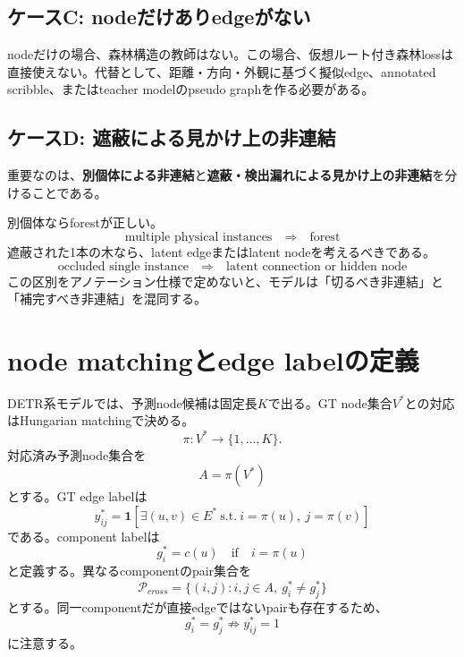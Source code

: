 \documentclass[11pt,a4paper]{article}
\newcommand{\one}{\mathbf{1}}
\begin{document}
\subsection{ケースC: nodeだけありedgeがない}
nodeだけの場合、森林構造の教師はない。この場合、仮想ルート付き森林lossは直接使えない。代替として、距離・方向・外観に基づく擬似edge、annotated scribble、またはteacher modelのpseudo graphを作る必要がある。

\subsection{ケースD: 遮蔽による見かけ上の非連結}
重要なのは、\textbf{別個体による非連結}と\textbf{遮蔽・検出漏れによる見かけ上の非連結}を分けることである。

別個体ならforestが正しい。
\begin{equation}
  \text{multiple physical instances}\quad\Rightarrow\quad \text{forest}
\end{equation}
遮蔽された1本の木なら、latent edgeまたはlatent nodeを考えるべきである。
\begin{equation}
  \text{occluded single instance}\quad\Rightarrow\quad \text{latent connection or hidden node}
\end{equation}
この区別をアノテーション仕様で定めないと、モデルは「切るべき非連結」と「補完すべき非連結」を混同する。

\section{node matchingとedge labelの定義}
DETR系モデルでは、予測node候補は固定長$K$で出る。GT node集合$V^*$との対応はHungarian matchingで決める。
\begin{equation}
  \pi:V^*\to\{1,\ldots,K\}.
\end{equation}
対応済み予測node集合を
\begin{equation}
  A=\pi(V^*)
\end{equation}
とする。GT edge labelは
\begin{equation}
  y_{ij}^*=\one\left[\exists (u,v)\in E^*\ \mathrm{s.t.}\ i=\pi(u),\ j=\pi(v)\right]
\end{equation}
である。component labelは
\begin{equation}
  g_i^*=c(u)\quad\text{if}\quad i=\pi(u)
\end{equation}
と定義する。異なるcomponentのpair集合を
\begin{equation}
  \mathcal{P}_{cross}=\{(i,j):i,j\in A,\ g_i^*\neq g_j^*\}
\end{equation}
とする。同一componentだが直接edgeではないpairも存在するため、
\begin{equation}
  g_i^*=g_j^* \not\Rightarrow y_{ij}^*=1
\end{equation}
に注意する。
\end{document}

